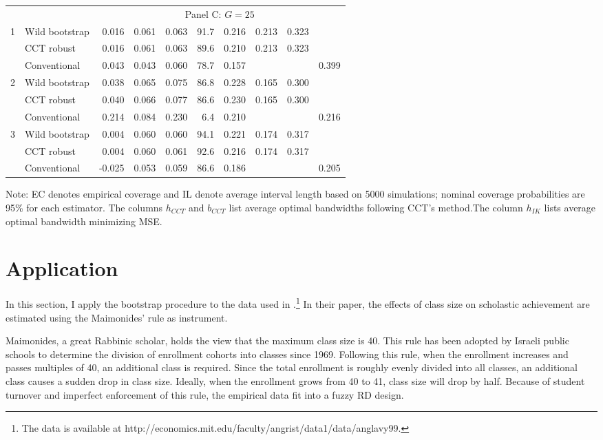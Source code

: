 \documentclass[12pt,]{article}
\DeclareMathOperator{\1}{\mathbbm{1}}
\begin{document}
\begin{table}
\begin{threeparttable}
\begin{tabular}{llrrrrrrrr}
			&& \multicolumn{8}{c}{Panel C: $G = 25$} \\ \cline{3-10}
			1 & Wild bootstrap & 0.016 & 0.061 & 0.063 & 91.7 & 0.216 & 0.213 & 0.323 &  \\ 
			& CCT robust & 0.016 & 0.061 & 0.063 & 89.6 & 0.210 & 0.213 & 0.323 &  \\ 
			& Conventional & 0.043 & 0.043 & 0.060 & 78.7 & 0.157 &  &  & 0.399 \\ 
			2 & Wild bootstrap & 0.038 & 0.065 & 0.075 & 86.8 & 0.228 & 0.165 & 0.300 &  \\ 
			& CCT robust & 0.040 & 0.066 & 0.077 & 86.6 & 0.230 & 0.165 & 0.300 &  \\ 
			& Conventional & 0.214 & 0.084 & 0.230 & 6.4 & 0.210 &  &  & 0.216 \\ 
			3 & Wild bootstrap & 0.004 & 0.060 & 0.060 & 94.1 & 0.221 & 0.174 & 0.317 &  \\ 
			& CCT robust & 0.004 & 0.060 & 0.061 & 92.6 & 0.216 & 0.174 & 0.317 &  \\ 
			& Conventional & -0.025 & 0.053 & 0.059 & 86.6 & 0.186 &  &  & 0.205 \\ 
			\hline
		\end{tabular}
		\begin{tablenotes}
			\small
			\item Note: EC denotes empirical coverage and IL denote average interval length based on 5000 simulations; nominal coverage probabilities are 95\% for each estimator. The columns $h_{CCT}$ and $b_{CCT}$ list average optimal bandwidths following CCT's method.The column $h_{IK}$ lists average optimal bandwidth minimizing MSE.
		\end{tablenotes}
	\end{threeparttable}
\end{table}

\section{Application}

In this section, I apply the bootstrap procedure to the data used in \cite{angrist1999using}.\footnote{The data is available at http://economics.mit.edu/faculty/angrist/data1/data/anglavy99.} In their paper, the effects of class size on scholastic achievement are estimated using the Maimonides' rule as instrument.

Maimonides, a great Rabbinic scholar, holds the view that the maximum class size is 40. This rule has been adopted by Israeli public schools to determine the division of enrollment cohorts into classes since 1969. Following this rule, when the enrollment increases and passes multiples of 40, an additional class is required. Since the total enrollment is roughly evenly divided into all classes, an additional class causes a sudden drop in class size. Ideally, when the enrollment grows from 40 to 41, class size will drop by half. Because of student turnover and imperfect enforcement of this rule, the empirical data fit into a fuzzy RD design.
\end{document}
